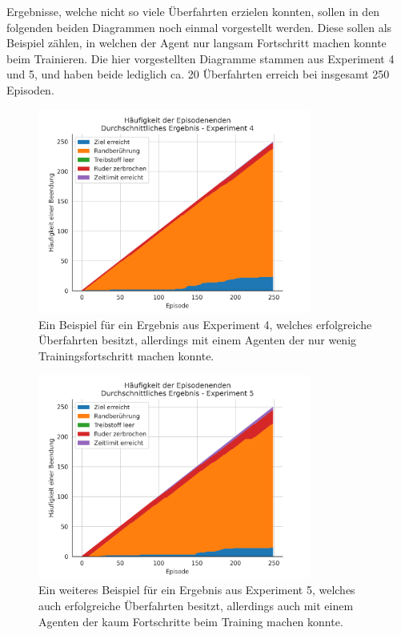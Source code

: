 \documentclass[]{iat}
\begin{document}
Ergebnisse, welche nicht so viele Überfahrten erzielen konnten, sollen in den folgenden beiden Diagrammen noch einmal vorgestellt werden. Diese sollen als Beispiel zählen, in welchen der Agent nur langsam Fortschritt machen konnte beim Trainieren. Die hier vorgestellten Diagramme stammen aus Experiment 4 und 5, und haben beide lediglich ca. 20 Überfahrten erreich bei insgesamt 250 Episoden.

\begin{figure}[H]
    \includegraphics[width=0.8\textwidth]{graphics/stacked_meh/stacked_plot_nb4.png}
    \centering
    \caption{Ein Beispiel für ein Ergebnis aus Experiment 4, welches erfolgreiche Überfahrten besitzt, allerdings mit einem Agenten der nur wenig Trainingsfortschritt machen konnte.}
    \label{abb:stacked_plot_nb4}
\end{figure}
\begin{figure}[H]
    \includegraphics[width=0.8\textwidth]{graphics/stacked_meh/stacked_plot_nb5.png}
    \centering
    \caption{Ein weiteres Beispiel für ein Ergebnis aus Experiment 5, welches auch erfolgreiche Überfahrten besitzt, allerdings auch mit einem Agenten der kaum Fortschritte beim Training machen konnte.}
    \label{abb:stacked_plot_nb5}
\end{figure}
\end{document}
